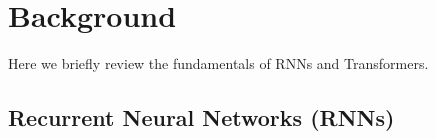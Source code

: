 \documentclass[11pt]{article}
\begin{document}
\section{Background} \label{background}
Here we briefly review the fundamentals of RNNs and Transformers. 


\subsection{Recurrent Neural Networks (RNNs)}
\end{document}
